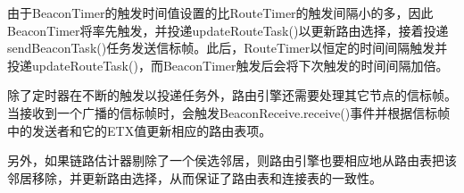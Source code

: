 由于BeaconTimer的触发时间值设置的比RouteTimer的触发间隔小的多，因此BeaconTimer将率先触发，并投递updateRouteTask()以更新路由选择，接着投递sendBeaconTask()任务发送信标帧。此后，RouteTimer以恒定的时间间隔触发并投递updateRouteTask()，而BeaconTimer触发后会将下次触发的时间间隔加倍。

除了定时器在不断的触发以投递任务外，路由引擎还需要处理其它节点的信标帧。当接收到一个广播的信标帧时，会触发BeaconReceive.receive()事件并根据信标帧中的发送者和它的ETX值更新相应的路由表项。

另外，如果链路估计器剔除了一个侯选邻居，则路由引擎也要相应地从路由表把该邻居移除，并更新路由选择，从而保证了路由表和连接表的一致性。

